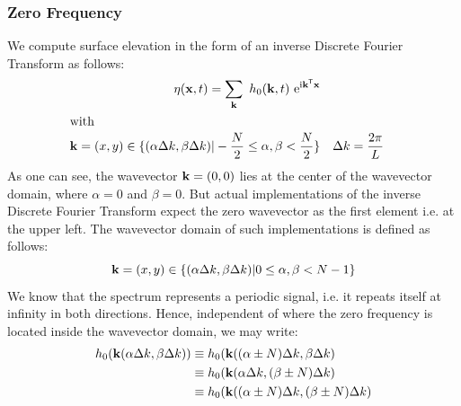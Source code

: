 \subsubsection{Zero Frequency}
%
\newcommand{\ccellnum}[2]{\cellcolor{#1}\num{#2}}
\newcommand{\mcleft}[2]{\multicolumn{1}{!{\color{#1}\vline}S}{#2}}
\newcommand{\mcright}[2]{\multicolumn{1}{S !{\color{#1}\vline}}{#2}}
\newcommand{\mcleftright}[2]{\multicolumn{1}{!{\color{#1}\vline} S !{\color{#1}\vline}}{#2}}
%
We compute surface elevation in the form of an inverse Discrete Fourier Transform as follows:
\begin{align}
\label{eq:surface_elevation_h0_k_t}
\eta(\mathbf{x}, t) = \sum_{\mathbf{k}}~h_0(\mathbf{k},t)~\mathrm{e}^{\mathrm{i}\mathbf{k}^{\mathsf{T}}\mathbf{x}} \\
\intertext{with}
\notag \mathbf{k} = (x,y)\in\{(\alpha\Delta k,\beta\Delta k)|
-\frac{N}{2}\leq\alpha,\beta<\frac{N}{2}\} &&
\Delta k = \frac{2\pi}{L}&
\end{align}
As one can see, the wavevector $\mathbf{k} = (0,0)$ lies at the center of the wavevector domain,
where $\alpha=0$ and $\beta=0$. But actual implementations of the inverse Discrete Fourier Transform
expect the zero wavevector as the first element i.e. at the upper left. The wavevector domain
of such implementations is defined as follows:
\begin{equation*}
\mathbf{k} = (x,y)\in\{(\alpha\Delta k,\beta\Delta k)|
0\leq\alpha,\beta<N-1\}
\end{equation*}
We know that the spectrum represents a periodic signal, i.e. it repeats itself at infinity in both directions.
Hence, independent of where the zero frequency is located inside the wavevector domain, we may write:
\begin{align*}
 h_0(\mathbf{k}(\alpha\Delta k,\beta\Delta k)) &\equiv h_0(\mathbf{k}((\alpha\pm N)\Delta k, \beta\Delta k) \\
					     &\equiv h_0(\mathbf{k}(\alpha\Delta k, (\beta\pm N)\Delta k) \\
					     &\equiv h_0(\mathbf{k}((\alpha\pm N)\Delta k, (\beta\pm N)\Delta k)
\end{align*}
%
